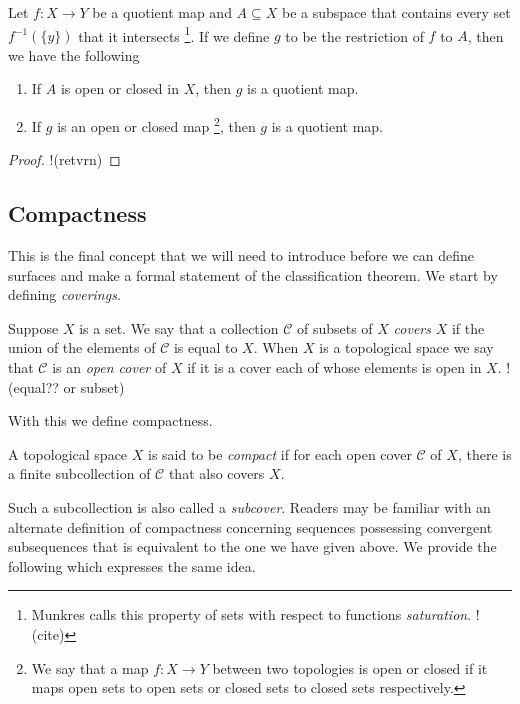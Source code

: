 \begin{thm}
  Let $f:X \rightarrow Y$ be a quotient map and $A \subseteq X$ be a
  subspace that contains every set $f^{-1}(\{ y \})$ that it
  intersects \footnote{Munkres calls this property of sets with
    respect to functions \emph{saturation}. !(cite)}. If we define $g$
  to be the restriction of $f$ to $A$, then we have the following
  \begin{enumerate}
  \item If $A$ is open or closed in $X$, then $g$ is a quotient map.
  \item If $g$ is an open or closed map \footnote{We say that a map
      $f:X \rightarrow Y$ between two topologies is open or closed if
      it maps open sets to open sets or closed sets to closed sets
      respectively.}, then $g$ is a quotient map.
  \end{enumerate}
\end{thm}

\begin{proof}
  !(retvrn)
\end{proof}

\subsection{Compactness}
\label{sec:prelims:compact}

This is the final concept that we will need to introduce before we can
define surfaces and make a formal statement of the classification
theorem. We start by defining \emph{coverings}.

\begin{defn}
  Suppose $X$ is a set. We say that a collection $\mathscr{C}$ of
  subsets of $X$ \emph{covers} $X$ if the union of the elements of
  $\mathscr{C}$ is equal to $X$. When $X$ is a topological space we
  say that $\mathscr{C}$ is an \emph{open cover} of $X$ if it is a
  cover each of whose elements is open in $X$. !(equal?? or subset)
\end{defn}

With this we define compactness.

\begin{defn}
  A topological space $X$ is said to be \emph{compact} if for each
  open cover $\mathscr{C}$ of $X$, there is a finite subcollection of
  $\mathscr{C}$ that also covers $X$.
\end{defn}

Such a subcollection is also called a \emph{subcover}. Readers may be
familiar with an alternate definition of compactness concerning
sequences possessing convergent subsequences that is equivalent to the
one we have given above. We provide the following which expresses the
same idea.

